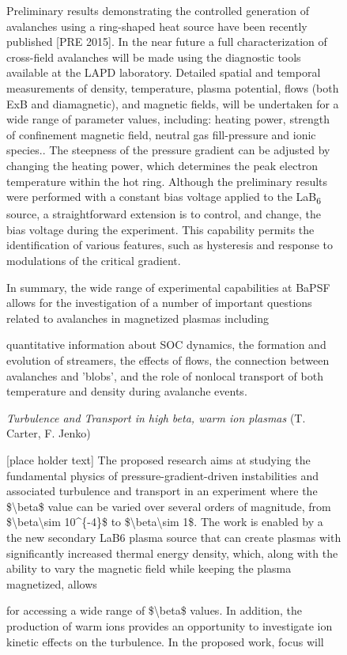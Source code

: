 \documentclass[11pt]{article}
\begin{document}
\begin{description}
\begin{figure}[!htbp]
Preliminary results demonstrating the controlled generation of
avalanches using a ring-shaped heat source have been recently published
{[}PRE 2015{]}. In the near future a full characterization of
cross-field avalanches will be made using the diagnostic tools available
at the LAPD laboratory. Detailed spatial and temporal measurements of
density, temperature, plasma potential, flows (both ExB and
diamagnetic), and magnetic fields, will be undertaken for a wide range
of parameter values, including: heating power, strength of confinement
magnetic field, neutral gas fill-pressure and ionic species.. The
steepness of the pressure gradient can be adjusted by changing the
heating power, which determines the peak electron temperature within the
hot ring. Although the preliminary results were performed with a
constant bias voltage applied to the LaB\textsubscript{6} source, a
straightforward extension is to control, and change, the bias voltage
during the experiment. This capability permits the identification of
various features, such as hysteresis and response to modulations of the
critical gradient.

In summary, the wide range of experimental capabilities at BaPSF allows
for the investigation of a number of important questions related to
avalanches in magnetized plasmas including

quantitative information about SOC dynamics, the formation and evolution
of streamers, the effects of flows, the connection between avalanches
and 'blobs', and the role of nonlocal transport of both temperature and
density during avalanche events.


\emph{Turbulence and Transport in high beta, warm ion plasmas} (T.
Carter, F. Jenko)


{[}place holder text{]} The proposed research aims at studying the
fundamental physics of pressure-gradient-driven instabilities and
associated turbulence and transport in an experiment where the
\$\textbackslash{}beta\$ value can be varied over several orders of
magnitude, from \$\textbackslash{}beta\textbackslash{}sim 10\^{}\{-4\}\$
to \$\textbackslash{}beta\textbackslash{}sim 1\$. The work is enabled by
a the new secondary LaB6 plasma source that can create plasmas with
significantly increased thermal energy density, which, along with the
ability to vary the magnetic field while keeping the plasma magnetized,
allows

for accessing a wide range of \$\textbackslash{}beta\$ values. In
addition, the production of warm ions provides an opportunity to
investigate ion kinetic effects on the turbulence. In the proposed work,
focus will


\end{figure}
\end{description}
\end{document}
